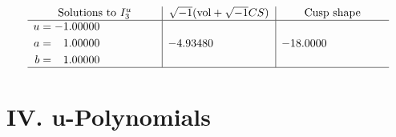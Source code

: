 \documentclass[1p]{elsarticle_modified}
\theoremstyle{definition}
\newcommand{\I}{\sqrt{-1}}
\begin{document}
$$\begin{array}{c|c|c}  
\text{Solutions to }I^u_{3}& \I (\text{vol} + \sqrt{-1}CS) & \text{Cusp shape}\\
 \hline 
\begin{aligned}
u &= -1.00000\phantom{ +0.000000I} \\
a &= \phantom{-}1.00000\phantom{ +0.000000I} \\
b &= \phantom{-}1.00000\phantom{ +0.000000I}\end{aligned}
 & -4.93480\phantom{ +0.000000I} & -18.0000\phantom{ +0.000000I}\\
 \hline 
 \end{array}$$\newpage
\newpage\renewcommand{\arraystretch}{1}
\centering \section*{ IV. u-Polynomials}
\end{document}
